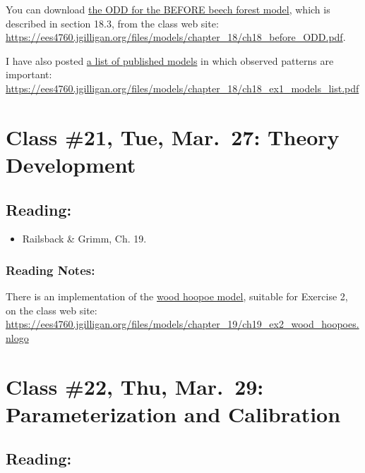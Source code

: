 \documentclass[]{article}
\providecommand{\tightlist}{%
  \setlength{\itemsep}{0pt}\setlength{\parskip}{0pt}}
\begin{document}
You can download \href{/files/models/chapter_18/ch18_before_ODD.pdf}{the
ODD for the BEFORE beech forest model}, which is described in section
18.3, from the class web site:
\url{https://ees4760.jgilligan.org/files/models/chapter_18/ch18_before_ODD.pdf}.

I have also posted
\href{/files/models/chapter_18/ch18_ex1_models_list.pdf}{a list of
published models} in which observed patterns are important:
\url{https://ees4760.jgilligan.org/files/models/chapter_18/ch18_ex1_models_list.pdf}

\hypertarget{class-21-tue-mar.27-theory-development}{%
\section{Class \#21, Tue, Mar.~27: Theory
Development}\label{class-21-tue-mar.27-theory-development}}

\hypertarget{reading-20}{%
\subsection{Reading:}\label{reading-20}}

\begin{itemize}
\tightlist
\item
  Railsback \& Grimm, Ch. 19.
\end{itemize}

\hypertarget{reading-notes-16}{%
\subsubsection{Reading Notes:}\label{reading-notes-16}}

There is an implementation of the
\href{/files/models/chapter_19/ch19_ex2_wood_hoopoes.nlogo}{wood hoopoe
model}, suitable for Exercise 2, on the class web site:
\url{https://ees4760.jgilligan.org/files/models/chapter_19/ch19_ex2_wood_hoopoes.nlogo}

\hypertarget{class-22-thu-mar.29-parameterization-and-calibration}{%
\section{Class \#22, Thu, Mar.~29: Parameterization and
Calibration}\label{class-22-thu-mar.29-parameterization-and-calibration}}

\hypertarget{reading-21}{%
\subsection{Reading:}\label{reading-21}}
\end{document}
